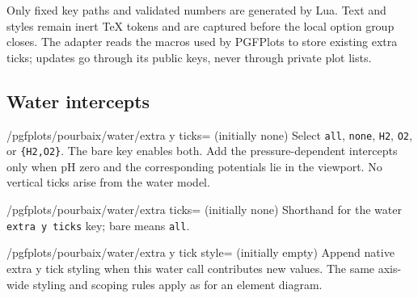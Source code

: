\documentclass[a4paper,11pt]{ltxdoc}
\begin{document}
Only fixed key paths and validated numbers are generated by Lua. Text and styles
remain inert TeX tokens and are captured before the local option group closes.
The adapter reads the macros used by PGFPlots to store existing extra ticks;
updates go through its public keys, never through private plot lists.

\subsection{Water intercepts}
\begin{key}{/pgfplots/pourbaix/water/extra y ticks= (initially none)}
Select \texttt{all}, \texttt{none}, \texttt{H2}, \texttt{O2}, or
\texttt{\{H2,O2\}}. The bare key enables both. Add the pressure-dependent
intercepts only when pH zero and the corresponding potentials lie in the viewport.
No vertical ticks arise from the water model.
\end{key}
\begin{key}{/pgfplots/pourbaix/water/extra ticks= (initially none)}
Shorthand for the water \texttt{extra y ticks} key; bare means \texttt{all}.
\end{key}
\begin{key}{/pgfplots/pourbaix/water/extra y tick style= (initially empty)}
Append native extra y tick styling when this water call contributes new values.
The same axis-wide styling and scoping rules apply as for an element diagram.
\end{key}
\end{document}
